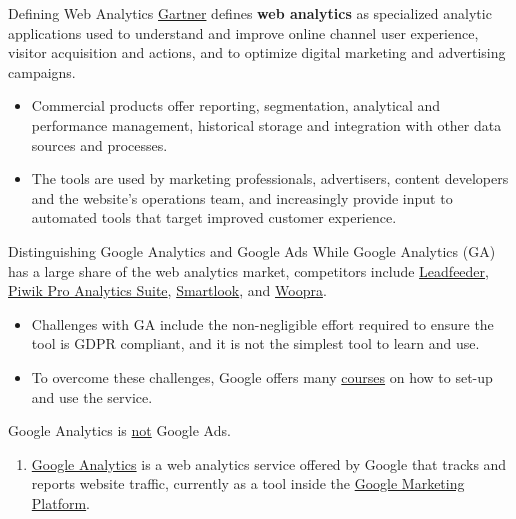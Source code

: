 \documentclass[pdf]{beamer}
\newcommand{\empr}[1]{{\color{franklinblue}\textbf{#1}}}
\theoremstyle{remark}
\theoremstyle{definition}
\begin{document}
\begin{frame}[t]{Defining Web Analytics}
\href{https://www.gartner.com/en/information-technology/glossary/web-analytics}{Gartner} defines \empr{web analytics} as specialized analytic applications used to understand and improve online channel user experience, visitor acquisition and actions, and to optimize digital marketing and advertising campaigns. \\
\vspace{1.5ex}
\begin{itemize}
\item Commercial products offer reporting, segmentation, analytical and performance management, historical storage and integration with other data sources and processes. 
\item The tools are used by marketing professionals, advertisers, content developers and the website's operations team, and increasingly provide input to automated tools that target improved customer experience. 
\end{itemize}
\end{frame}

\begin{frame}[t]{Distinguishing Google Analytics and Google Ads}
While Google Analytics (GA) has a large share of the web analytics market, competitors include \href{https://www.leadfeeder.com/}{Leadfeeder}, \href{https://piwik.pro/}{Piwik Pro Analytics Suite}, \href{https://www.smartlook.com/}{Smartlook}, and \href{https://www.woopra.com/}{Woopra}.
\begin{itemize}
\item Challenges with GA include the non-negligible effort required to ensure the tool is GDPR compliant, and it is not the simplest tool to learn and use.  
\item To overcome these challenges, Google offers many \href{https://skillshop.exceedlms.com/student/catalog/browse}{courses} on how to set-up and use the service.
\end{itemize}
Google Analytics is \underline{not} Google Ads.  
\begin{enumerate}
  \item \href{https://marketingplatform.google.com/about/analytics/}{Google Analytics} is a web analytics service offered by Google that tracks and reports website traffic, currently as a tool inside the \href{https://support.google.com/marketingplatform/answer/9013946?hl=en}{Google Marketing Platform}. 
\end{enumerate}
\end{frame}
\end{document}
